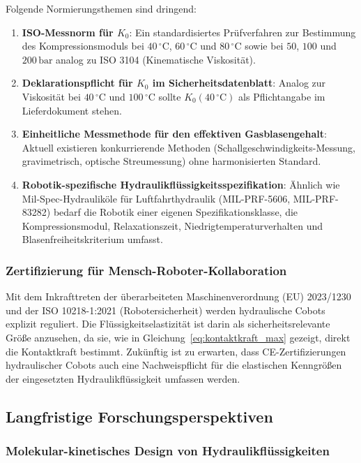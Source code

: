 ﻿\documentclass[a4paper,12pt]{scrreprt}
\theoremstyle{definition}
\begin{document}
Folgende Normierungsthemen sind dringend:
\begin{enumerate}
  \item \textbf{ISO-Messnorm für $K_0$}: Ein standardisiertes Prüfverfahren
    zur Bestimmung des Kompressionsmoduls bei $40\,{^\circ}\mathrm{C}$,
    $60\,{^\circ}\mathrm{C}$ und $80\,{^\circ}\mathrm{C}$ sowie bei $50$, $100$
    und $200\,\mathrm{bar}$ analog zu ISO 3104 (Kinematische Viskosität).
  \item \textbf{Deklarationspflicht für $K_0$ im Sicherheitsdatenblatt}:
    Analog zur Viskosität bei $40\,{^\circ}\mathrm{C}$ und $100\,{^\circ}\mathrm{C}$
    sollte $K_0(40\,{^\circ}\mathrm{C})$ als Pflichtangabe im Lieferdokument stehen.
  \item \textbf{Einheitliche Messmethode für den effektiven Gasblasengehalt}:
    Aktuell existieren konkurrierende Methoden (Schallgeschwindigkeits-Messung,
    gravimetrisch, optische Streumessung) ohne harmonisierten Standard.
  \item \textbf{Robotik-spezifische Hydraulikflüssigkeitsspezifikation}:
    Ähnlich wie Mil-Spec-Hydrauliköle für Luftfahrthydraulik
    (MIL-PRF-5606, MIL-PRF-83282) bedarf die Robotik einer eigenen
    Spezifikationsklasse, die Kompressionsmodul, Relaxationszeit,
    Niedrig\-temperaturverhalten und Blasenfreiheitskriterium umfasst.
\end{enumerate}

\subsubsection{Zertifizierung für Mensch-Roboter-Kollaboration}

Mit dem Inkrafttreten der überarbeiteten Maschinenverordnung
(EU) 2023/1230 und der ISO 10218-1:2021 (Robotersicherheit)
werden hydraulische Cobots explizit reguliert. Die Flüssigkeitselastizität
ist darin als sicherheitsrelevante Größe anzusehen, da sie,
wie in Gleichung~\eqref{eq:kontaktkraft_max} gezeigt, direkt
die Kontaktkraft bestimmt. Zukünftig ist zu erwarten, dass
CE-Zertifizierungen hydraulischer Cobots auch eine Nachweis\-pflicht
für die elastischen Kenngrößen der eingesetzten Hydraulikflüssig\-keit
umfassen werden.

\subsection{Langfristige Forschungsperspektiven}

\subsubsection{Molekular-kinetisches Design von Hydraulikflüssigkeiten}
\end{document}
